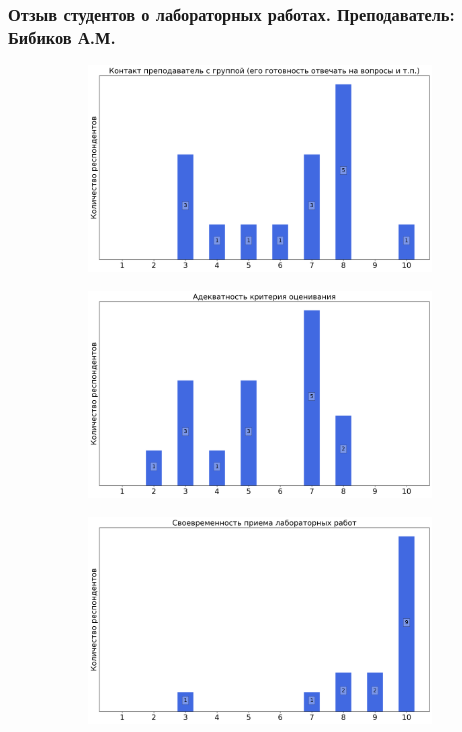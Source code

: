     \subsubsection{Отзыв студентов о лабораторных работах. Преподаватель: Бибиков А.М.}
		\begin{figure}[H]
			\centering
			\begin{subfigure}[b]{0.45\textwidth}
				\centering
				\includegraphics[width=\textwidth]{images/3 course/Аналоговая электроника/labniks-marks-Бибиков А.М.-0.png}
			\end{subfigure}
			\begin{subfigure}[b]{0.45\textwidth}
				\centering
				\includegraphics[width=\textwidth]{images/3 course/Аналоговая электроника/labniks-marks-Бибиков А.М.-1.png}
			\end{subfigure}
			\begin{subfigure}[b]{0.45\textwidth}
				\centering
				\includegraphics[width=\textwidth]{images/3 course/Аналоговая электроника/labniks-marks-Бибиков А.М.-2.png}

\end{subfigure}
\end{figure}
